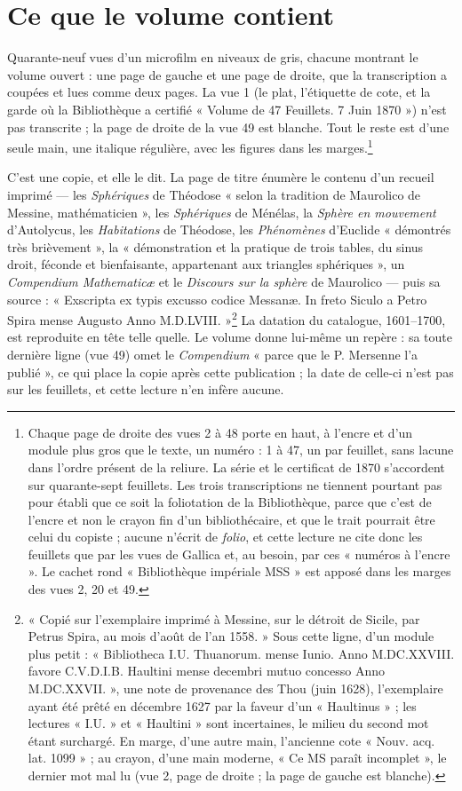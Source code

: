 \documentclass[11pt,a4paper]{article}
\begin{document}
\section*{Ce que le volume contient}

Quarante-neuf vues d'un microfilm en niveaux de gris, chacune montrant le
volume ouvert : une page de gauche et une page de droite, que la
transcription a coupées et lues comme deux pages. La vue 1 (le plat, l'étiquette
de cote, et la garde où la Bibliothèque a certifié « Volume de 47 Feuillets.
7 Juin 1870 ») n'est pas transcrite ; la page de droite de la vue 49 est
blanche. Tout le reste est d'une seule main, une italique régulière, avec les
figures dans les marges.\footnote{Chaque page de droite des vues 2 à 48 porte en
haut, à l'encre et d'un module plus gros que le texte, un numéro : 1 à 47, un
par feuillet, sans lacune dans l'ordre présent de la reliure. La série et le
certificat de 1870 s'accordent sur quarante-sept feuillets. Les trois
transcriptions ne tiennent pourtant pas pour établi que ce soit la foliotation
de la Bibliothèque,
parce que c'est de l'encre et non le crayon fin d'un bibliothécaire, et que le
trait pourrait être celui du copiste ; aucune n'écrit de \emph{folio}, et cette
lecture ne cite donc les feuillets que par les vues de Gallica et, au besoin,
par ces « numéros à l'encre ». Le cachet rond « Bibliothèque impériale
MSS » est apposé dans les marges des vues 2, 20 et 49.}

C'est une copie, et elle le dit. La page de titre énumère le contenu d'un
recueil imprimé — les \emph{Sphériques} de Théodose « selon la tradition de
Maurolico de Messine, mathématicien », les \emph{Sphériques} de Ménélas, la
\emph{Sphère en mouvement} d'Autolycus, les \emph{Habitations} de Théodose, les
\emph{Phénomènes} d'Euclide « démontrés très brièvement », la « démonstration
et la pratique de trois tables, du sinus droit, féconde et bienfaisante,
appartenant aux triangles sphériques », un \emph{Compendium Mathematicæ} et le
\emph{Discours sur la sphère} de Maurolico — puis sa source : « Exscripta ex
typis excusso codice Messanæ. In freto Siculo a Petro Spira mense Augusto Anno
M.D.LVIII. »\footnote{« Copié sur l'exemplaire imprimé à Messine, sur le
détroit de Sicile, par Petrus Spira, au mois d'août de l'an 1558. » Sous cette
ligne, d'un module plus petit : « Bibliotheca I.U. Thuanorum. mense Iunio. Anno
M.DC.XXVIII. favore C.V.D.I.B. Haultini mense decembri mutuo concesso Anno
M.DC.XXVII. », une note de provenance des Thou (juin 1628), l'exemplaire ayant
été prêté en décembre 1627 par la faveur d'un « Haultinus » ; les lectures
« I.U. » et « Haultini » sont incertaines, le milieu du second mot étant
surchargé. En marge, d'une autre main, l'ancienne cote « Nouv. acq. lat.
1099 » ; au crayon, d'une main moderne, « Ce MS paraît incomplet », le
dernier mot mal lu (vue 2, page de droite ; la page de gauche est blanche).}
La datation du catalogue, 1601--1700, est reproduite en tête telle quelle. Le
volume donne lui-même un repère : sa toute dernière ligne (vue 49) omet le
\emph{Compendium} « parce que le P. Mersenne l'a publié », ce qui place la
copie après cette publication ; la date de celle-ci n'est pas sur les feuillets,
et cette lecture n'en infère aucune.
\end{document}
